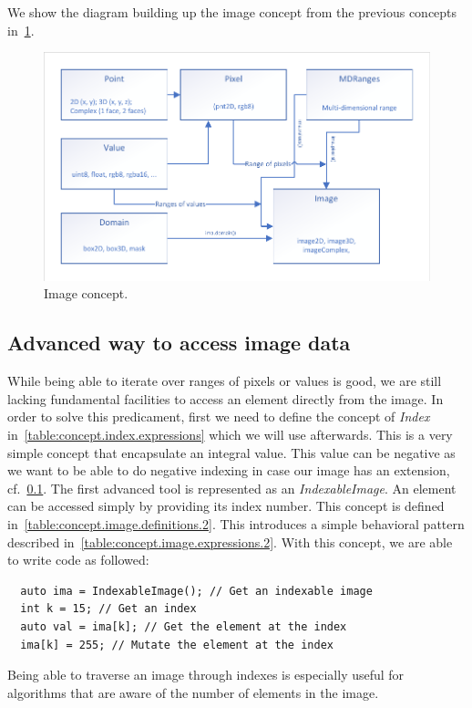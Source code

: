 We show the diagram building up the image concept from the previous concepts in~\cref{fig:concept.image}.

\begin{figure}[htbp]
  \centering
  \includegraphics[width=.8\linewidth]{figs/concepts/image.pdf}
  \caption{Image concept.}
  \label{fig:concept.image}
\end{figure}


\subsection{Advanced way to access image data}
\label{subsec:advanced}

While being able to iterate over ranges of pixels or values is good, we are still lacking fundamental facilities to
access an element directly from the image. In order to solve this predicament, first we need to define the concept of
\emph{Index} in~\cref{table:concept.index.expressions} which we will use afterwards. This is a very simple concept that
encapsulate an integral value. This value can be negative as we want to be able to do negative indexing in case our
image has an extension, cf.~\cref{subsec:advanced}. The first advanced tool is represented as an \emph{IndexableImage}.
An element can be accessed simply by providing its index number. This concept is defined
in~\cref{table:concept.image.definitions.2}. This introduces a simple behavioral pattern described
in~\cref{table:concept.image.expressions.2}. With this concept, we are able to write code as followed:
\begin{verbatim}
  auto ima = IndexableImage(); // Get an indexable image
  int k = 15; // Get an index
  auto val = ima[k]; // Get the element at the index
  ima[k] = 255; // Mutate the element at the index
\end{verbatim}
Being able to traverse an image through indexes is especially useful for algorithms that are aware of the number of
elements in the image.

